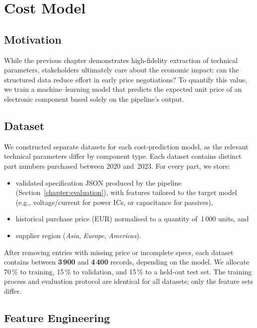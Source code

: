 \chapter{Cost Model}
\label{chapter:costmodel}

\section{Motivation}
While the previous chapter demonstrates high-fidelity extraction of technical parameters, stakeholders ultimately care about the economic impact: can the structured data reduce effort in early price negotiations?  To quantify this value, we train a machine–learning model that predicts the expected unit price of an electronic component based solely on the pipeline's output.

\section{Dataset}
We constructed separate datasets for each cost-prediction model, as the relevant technical parameters differ by component type. Each dataset contains distinct part numbers purchased between 2020 and~2023. For every part, we store:
\begin{itemize}
  \item validated specification JSON produced by the pipeline (Section~\ref{chapter:evaluation}), with features tailored to the target model (e.g., voltage/current for power ICs, or capacitance for passives),
  \item historical purchase price (EUR) normalised to a quantity of~1\,000 units, and
  \item supplier region (\textit{Asia}, \textit{Europe}, \textit{Americas}).
\end{itemize}
After removing entries with missing price or incomplete specs, each dataset contains between \textbf{3\,900} and \textbf{4\,400} records, depending on the model. We allocate 70\,\% to training, 15\,\% to validation, and 15\,\% to a held-out test set. The training process and evaluation protocol are identical for all datasets; only the feature sets differ.

\section{Feature Engineering}
